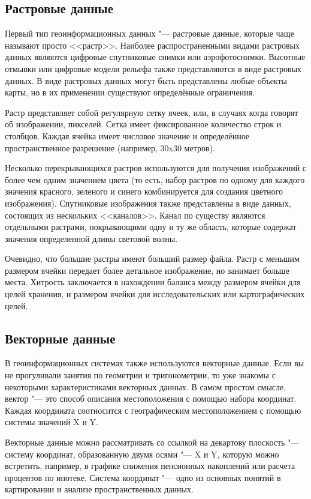 \subsection{Растровые данные}\label{label_rasterdata}

Первый тип геоинформационных данных "--- растровые данные, которые чаще называют
просто <<растр>>. Наиболее распространенными видами растровых данных являются
цифровые спутниковые снимки или аэрофотоснимки. Высотные отмывки или цифровые
модели рельефа также представляются в виде растровых данных. В виде растровых
данных могут быть представлены любые объекты карты, но в их применении
существуют определённые ограничения.

Растр представляет собой регулярную сетку ячеек, или, в случаях когда
говорят об изображении, пикселей. Сетка имеет фиксированное количество
строк и столбцов. Каждая ячейка имеет числовое значение и определённое
пространственное разрешение (например, 30x30 метров).

Несколько перекрывающихся растров используются для получения изображений
с более чем одним значением цвета (то есть, набор растров по одному для каждого
значения красного, зеленого и синего комбинируется для создания
цветного изображения). Спутниковые изображения также представлены в виде данных,
состоящих из нескольких <<каналов>>. Канал по существу являются отдельными растрами,
покрывающими одну и ту же область, которые содержат значения определенной
длины световой волны.

Очевидно, что большие растры имеют больший размер файла. Растр с меньшим
размером ячейки передает более детальное изображение, но занимает больше места.
Хитрость заключается в нахождении баланса между размером ячейки для целей
хранения, и размером ячейки для исследовательских или картографических целей.

\subsection{Векторные данные}\label{label_vectordata}

В геоинформационных системах также используются векторные данные. Если
вы не прогуливали занятия по геометрии и тригонометрии, то уже знакомы
с некоторыми характеристиками векторных данных. В самом простом смысле,
вектор "--- это способ описания местоположения с помощью набора координат.
Каждая координата соотносится с географическим местоположением с помощью
системы значений X и Y.

Векторные данные можно рассматривать со ссылкой на декартову плоскость "---
систему координат, образованную двумя осями "--- X и Y, которую можно встретить,
например, в графике снижения пенсионных накоплений или расчета процентов по ипотеке.
Система координат "--- одно из основных понятий в картировании и анализе пространственных
данных.

